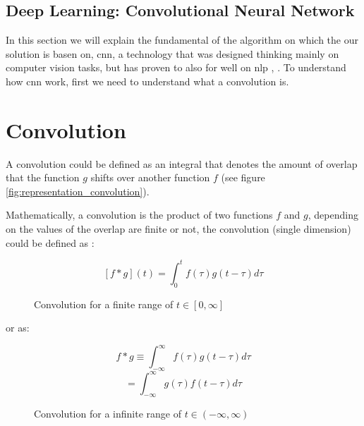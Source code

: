 \cite{ensemble2009Polikar}

\fi

\subsection{Deep Learning: Convolutional Neural Network}
\label{subsec:deep_learning}

In this section we will explain the fundamental of the algorithm on which the our solution is basen on, \acrlong{cnn}, a technology that was designed thinking mainly on computer vision tasks, but has proven to also for well on \acrshort{nlp} \cite{zhang2015sensitivity}, \cite{kim2014convolutional}. To understand how \acrshort{cnn} work, first we need to understand what a convolution is.

\section{Convolution}

A convolution could be defined as an integral that denotes the amount of overlap that the function $g$ shifts over another function $f$ (see figure \ref{fig:representation_convolution}).

Mathematically, a convolution is the product of two functions $f$ and $g$, depending on the values of the overlap are finite or not, the convolution (single dimension) could be defined as \cite{convolution}: 

\begin{figure}[!htp]
  \center
  \[[f \ast g](t)=\int_{0}^{t} f(\tau)g(t-\tau)d\tau\]
  \caption{Convolution for a finite range of $t \in [0, \infty]$}
  \label{fig:convolution_finite_range}
\end{figure}

or as:

\begin{figure}[!htp]
  \center
  \[f \ast g \equiv \int_{-\infty}^{\infty} f(\tau)g(t-\tau)d\tau\]\[=\int_{-\infty}^{\infty} g(\tau)f(t-\tau)d\tau\]
  \caption{Convolution for a infinite range of $t \in (-\infty, \infty)$}
  \label{fig:convolution_infinite_range}
\end{figure}

